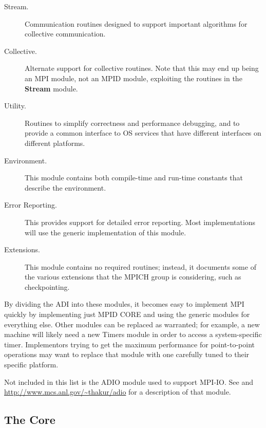 \documentclass{article}
\begin{document}
\begin{description}
\item[Stream.] Communication routines designed to support
important algorithms for collective communication.

\item[Collective.] Alternate support for collective
routines. Note that this may end up being an MPI module, not
an MPID module, exploiting the routines in the \textbf{Stream} module.

\item[Utility.] Routines to simplify correctness and performance
debugging, and to provide a common interface to OS services that have
different interfaces on different platforms.

\item[Environment.] This module contains both compile-time and run-time
constants that describe the environment. 


\item[Error Reporting.] This provides support for detailed error
reporting.  Most implementations will use the generic implementation
of this module.

\item[Extensions.] This module contains no required routines; instead,
it documents some of the various extensions that the MPICH group is
considering, such as checkpointing.
\end{description}

By dividing the ADI into these modules, it becomes easy to implement
MPI quickly by implementing just MPID CORE and using the generic
modules for everything else.  Other modules can be replaced as
warranted; for example, a new machine will likely need a new Timers
module in order to access a system-specific timer.  Implementors
trying to get the maximum performance for point-to-point operations
may want to replace that module with one carefully tuned to their
specific platform.

Not included in this list is the ADIO module used to support MPI-IO.
See \cite{ThakurGroLus96} and \url{http://www.mcs.anl.gov/~thakur/adio} 
for a description of that module.

\subsection{The Core}
\label{sec-minimal}
\end{document}
